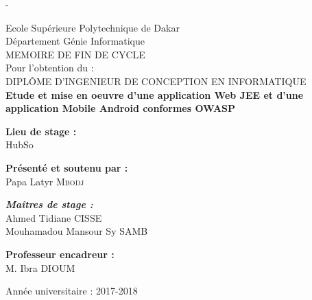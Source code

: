 \begin{titlingpage}
\begin{SingleSpace}
\begin{adjustwidth*}{\unitlength}{-\unitlength}
\begin{center}
				{\large Ecole Supérieure Polytechnique de Dakar }\\
				{\large Département Génie Informatique }\\
				\vspace{12mm}
				{\large MEMOIRE DE FIN DE CYCLE }~\\[0.1cm]
				{\large Pour l'obtention du : }~\\[0.1cm]
				{\large DIPLÔME D'INGENIEUR DE CONCEPTION EN INFORMATIQUE }~\\[0.1cm]
				\vspace{12mm}
				\textbf{\huge Etude et mise en oeuvre d'une application Web JEE et d'une application Mobile Android conformes OWASP }\\[4mm]
				\vspace{3mm}
				\hspace{3mm}
				\begin{center}
					{\large \textbf{Lieu de stage :}}\\
					HubSo\\
				\end{center}
				\vspace{3mm}
				\hspace{3mm}
					\begin{flushleft}
						{\large \textbf{Présenté et soutenu par :}}\\
						Papa Latyr \textsc{Mbodj}\\
					\end{flushleft}
				\vspace{3mm}
				\hspace{3mm}
					\begin{center}
						{\large \textbf{\emph{Maîtres de stage :} }}\\
						{\large {Ahmed Tidiane CISSE}}\\
						{\large {Mouhamadou Mansour Sy SAMB}}\\
					\end{center}
				\vspace{3mm}
				\hspace{3mm}
					\begin{flushright}
						{\large \textbf{Professeur encadreur :} }\\
						{\large{M. Ibra DIOUM}}\\
					\end{flushright}
				\vspace{12mm}
				{\large Année universitaire : 2017-2018 }~\\[0.1cm]
			\end{center}
		\end{adjustwidth*}
	\end{SingleSpace}
\end{titlingpage}
\clearpage
